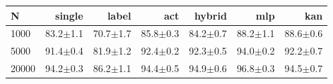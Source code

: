 \begin{tabular}{@{}lrrrrrr@{}}\toprule
N & single & label & act & hybrid & mlp & kan\\\midrule
1000 & 83.2$\pm$1.1 & 70.7$\pm$1.7 & 85.8$\pm$0.3 & 84.2$\pm$0.7 & 88.2$\pm$1.1 & 88.6$\pm$0.6\\
5000 & 91.4$\pm$0.4 & 81.9$\pm$1.2 & 92.4$\pm$0.2 & 92.3$\pm$0.5 & 94.0$\pm$0.2 & 92.2$\pm$0.7\\
20000 & 94.2$\pm$0.3 & 86.2$\pm$1.1 & 94.4$\pm$0.5 & 94.9$\pm$0.6 & 96.8$\pm$0.3 & 94.5$\pm$0.7\\
\bottomrule\end{tabular}